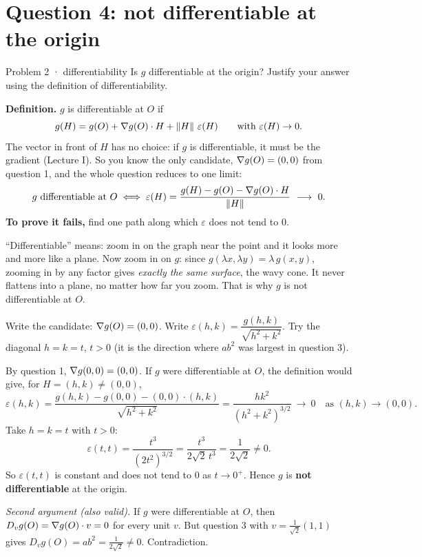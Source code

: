 \section{Question 4: not differentiable at the origin}

\begin{question}{Problem 2 \;·\; differentiability}
Is $g$ differentiable at the origin? Justify your answer using the definition of differentiability.
\end{question}

\begin{lesson}
\textbf{Definition.} $g$ is differentiable at $O$ if
\[
  g(H)=g(O)+\nabla g(O)\cdot H+\left\lVert H\right\rVert\,\varepsilon(H)\qquad\text{with }\varepsilon(H)\to0 .
\]
The vector in front of $H$ has no choice: if $g$ is differentiable, it must be the gradient
(Lecture I). So you know the only candidate, $\nabla g(O)=(0,0)$ from question 1, and the whole
question reduces to one limit:
\[
  g\ \text{differentiable at }O\iff
  \varepsilon(H)=\frac{g(H)-g(O)-\grad g(O)\cdot H}{\norm H}\ \longrightarrow\ 0 .
\]
\textbf{To prove it fails,} find one path along which $\varepsilon$ does not tend to $0$.
\end{lesson}

\begin{intuition}
``Differentiable'' means: zoom in on the graph near the point and it looks more and more like a
plane. Now zoom in on $g$: since $g(\lambda x,\lambda y)=\lambda\,g(x,y)$, zooming in by any factor gives
\emph{exactly the same surface}, the wavy cone. It never flattens into a plane, no matter how far you
zoom. That is why $g$ is not differentiable at $O$.
\end{intuition}

\begin{howto}
Write the candidate: $\nabla g(O)=(0,0)$. Write $\varepsilon(h,k)=\dfrac{g(h,k)}{\sqrt{h^2+k^2}}$.
Try the diagonal $h=k=t$, $t>0$ (it is the direction where $ab^2$ was largest in question 3).
\end{howto}

\begin{answer}
By question 1, $\nabla g(0,0)=(0,0)$. If $g$ were differentiable at $O$, the definition would give,
for $H=(h,k)\ne(0,0)$,
\[
  \varepsilon(h,k)=\frac{g(h,k)-g(0,0)-(0,0)\cdot(h,k)}{\sqrt{h^2+k^2}}
  =\frac{hk^2}{(h^2+k^2)^{3/2}}\ \longrightarrow\ 0\quad\text{as }(h,k)\to(0,0).
\]
Take $h=k=t$ with $t>0$:
\[
  \varepsilon(t,t)=\frac{t^3}{(2t^2)^{3/2}}=\frac{t^3}{2\sqrt2\,t^3}=\frac1{2\sqrt2}\ne0 .
\]
So $\varepsilon(t,t)$ is constant and does not tend to $0$ as $t\to0^+$. Hence $g$ is
\textbf{not differentiable} at the origin.

\emph{Second argument (also valid).} If $g$ were differentiable at $O$, then $D_vg(O)=\nabla g(O)\cdot v=0$
for every unit $v$. But question 3 with $v=\frac1{\sqrt2}(1,1)$ gives $D_vg(O)=ab^2=\frac1{2\sqrt2}\ne0$.
Contradiction.
\end{answer}

